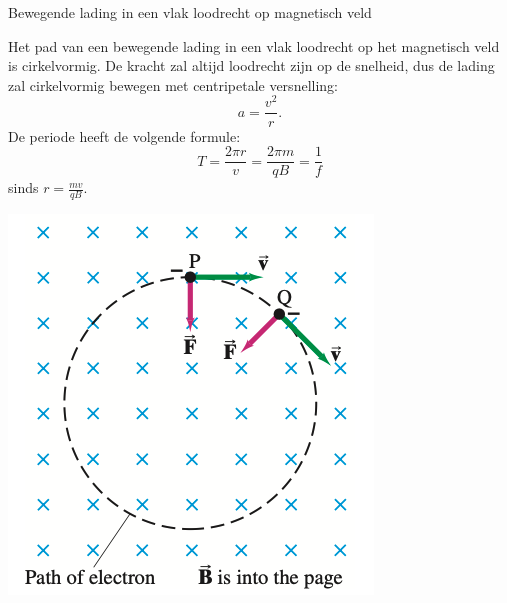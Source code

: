 \begin{app}{Bewegende lading in een vlak loodrecht op magnetisch veld}
    \begin{minipage}{.67\textwidth}
        Het pad van een bewegende lading in een vlak loodrecht op het magnetisch veld is cirkelvormig.
        De kracht zal altijd loodrecht zijn op de snelheid, dus de lading zal cirkelvormig bewegen met
        centripetale versnelling:
        \begin{equation*}
            a = \dfrac{v^2}{r}.
        \end{equation*}
        De periode heeft de volgende formule:
        \begin{equation*}
            T = \dfrac{2\pi r}{v} = \dfrac{2\pi m}{qB} = \dfrac{1}{f}
        \end{equation*}
        sinds $r = \tfrac{mv}{qB}$.
    \end{minipage}
    \begin{minipage}{.29\textwidth}
        \includegraphics[scale = 0.35]{Images/Magnetisme/CirkelvormigeBewegingMagentischVeld}
    \end{minipage}
\end{app}

\newpage

